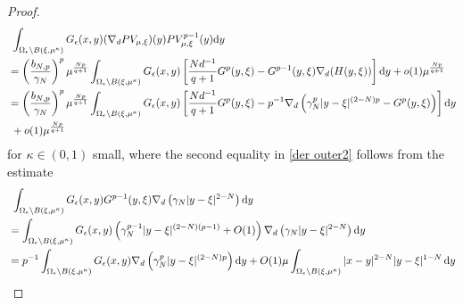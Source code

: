 \documentclass[reqno]{amsart}
\theoremstyle{remark}
\newcommand{\ep}{\epsilon}
\newcommand{\ga}{\gamma}
\newcommand{\dy}{\textup{d}y}
\newcommand{\mx}{{\mu,\xi}}
\renewcommand{\(}{\left(}
\renewcommand{\)}{\right)}
\numberwithin{equation}{section}
\begin{document}
\begin{proof}
\begin{equation}
\begin{aligned}
&\ \int_{\Omega_\ep \setminus B(\xi,\mu^\kappa)} G_\ep(x,y) (\nabla_d PV_\mx)(y) PV_\mx^{p-1}(y)\dy \\
&=\(\frac{b_{N,p}}{\ga_N}\)^p\mu^{\frac{Np}{q+1}} \int_{\Omega_\ep \setminus B(\xi,\mu^\kappa)} G_\ep(x,y) \left[\frac{Nd^{-1}}{q+1}G^p(y,\xi)-G^{p-1}(y,\xi)\nabla_d (H(y,\xi))\right]\dy + o(1)\mu^{\frac{Np}{q+1}} \\
&= \(\frac{b_{N,p}}{\ga_N}\)^p\mu^{\frac{Np}{q+1}}\int_{\Omega_\ep \setminus B(\xi,\mu^\kappa)} G_\ep(x,y)
\left[\frac{Nd^{-1}}{q+1}G^p(y,\xi) -p^{-1}\nabla_d \(\ga_N^p|y-\xi|^{(2-N)p}- G^p(y,\xi)\)\right]\dy \\
&\ + o(1)\mu^{\frac{Np}{q+1}}
\end{aligned}
\end{equation}
for $\kappa \in (0,1)$ small, where the second equality in \eqref{der outer2} follows from the estimate
\begin{align*}
&\ \int_{\Omega_\ep \setminus B(\xi,\mu^\kappa)} G_\ep(x,y)G^{p-1}(y,\xi)\nabla_d\(\ga_N|y-\xi|^{2-N}\)\dy\\
&=\int_{\Omega_\ep \setminus B(\xi,\mu^\kappa)} G_\ep(x,y) \(\ga_N^{p-1}|y-\xi|^{(2-N)(p-1)}+O(1)\) \nabla_d\(\ga_N|y-\xi|^{2-N}\)\dy\\
&=p^{-1}\int_{\Omega_\ep \setminus B(\xi,\mu^\kappa)} G_\ep(x,y) \nabla_d\(\ga_N^p|y-\xi|^{(2-N)p}\)\dy + O(1)\mu\int_{\Omega_\ep \setminus B(\xi,\mu^\kappa)}|x-y|^{2-N}|y-\xi|^{1-N}\, \dy\\

\end{align*}
\end{proof}
\end{document}
